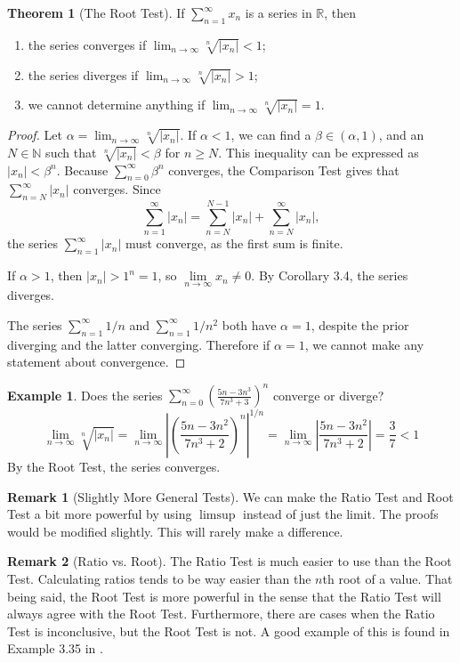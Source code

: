 \documentclass{article}
\newcommand{\N}{\mathbb{N}}
\newcommand{\R}{\mathbb{R}}
\theoremstyle{definition}
\newtheorem{theorem}{Theorem}[section]
\newtheorem{example}{Example}[section]
\newtheorem{remark}{Remark}[section]
\begin{document}
	\begin{theorem}[The Root Test]
		If $ \sum_{n=1}^{\infty}x_n  $ is a series in $ \R $, then
		\begin{enumerate}
			\item the series converges if $ \lim_{n\to\infty}\sqrt[n]{|x_n|}<1 $;
			\item the series diverges if $ \lim_{n\to\infty}\sqrt[n]{|x_n|}>1 $;
			\item we cannot determine anything if $ \lim_{n\to\infty}\sqrt[n]{|x_n|}=1 $.
		\end{enumerate} 
	\end{theorem}
	\begin{proof}
		Let $ \alpha=\lim_{n\to\infty}\sqrt[n]{|x_n|} $. If $ \alpha <1 $, we can find a $ \beta\in(\alpha,1) $, and an $ N\in\N $ such that $ \sqrt[n]{|x_n|}<\beta$ for $ n\ge N $. This inequality can be expressed as $ |x_n|<\beta^n $. Because $ \sum_{n=0}^{\infty}\beta^n $ converges, the Comparison Test gives that $\sum_{n=N}^\infty{|x_n|}$ converges. Since $$ \sum_{n=1}^\infty{|x_n|}=\sum_{n=N}^{N-1}{|x_n|}+\sum_{n=N}^\infty{|x_n|},$$ the series $ \sum_{n=1}^\infty{|x_n|} $ must converge, as the first sum is finite. 
		
		If $ \alpha>1 $, then $ |x_n|>1^n=1 $, so $ \lim\limits_{n\to\infty}x_n\neq 0 $. By Corollary 3.4, the series diverges.
		
		The series $ \sum_{n=1}^{\infty}1/n $ and $ \sum_{n=1}^{\infty}1/n^2 $ both have $ \alpha=1 $, despite the prior diverging and the latter converging. Therefore if $ \alpha=1 $, we cannot make any statement about convergence. 
	\end{proof}
	\begin{example}
		Does the series $\sum_{n=0}^{\infty}\left(\frac{5n-3n^3}{7n^3+3}\right)^n $ converge or diverge? 
		$$\lim\limits_{n\to\infty}\sqrt[n]{|x_n|}=\lim\limits_{n\to\infty}\left\lvert\left(\frac{5n-3n^2}{7n^3+2}\right)^n\right\rvert^{1/n} =\lim\limits_{n\to\infty}\left\lvert\frac{5n-3n^2}{7n^3+2}\right\rvert=\frac{3}{7}<1$$ By the Root Test, the series converges.
	\end{example}
	\begin{remark}[Slightly More General Tests]
		We can make the Ratio Test and Root Test a bit more powerful by using $ \limsup $ instead of just the limit. The proofs would be modified slightly. This will rarely make a difference. 
	\end{remark}
	\begin{remark}[Ratio vs. Root]
		The Ratio Test is much easier to use than the Root Test. Calculating ratios tends to be way easier than the $ n $th root of a value. That being said, the Root Test is more powerful in the sense that the Ratio Test will always agree with the Root Test. Furthermore, there are cases when the Ratio Test is inconclusive, but the Root Test is not. A good example of this is found in Example 3.35 in \cite{rudin1964principles}. 
	\end{remark}
	
\end{document}
